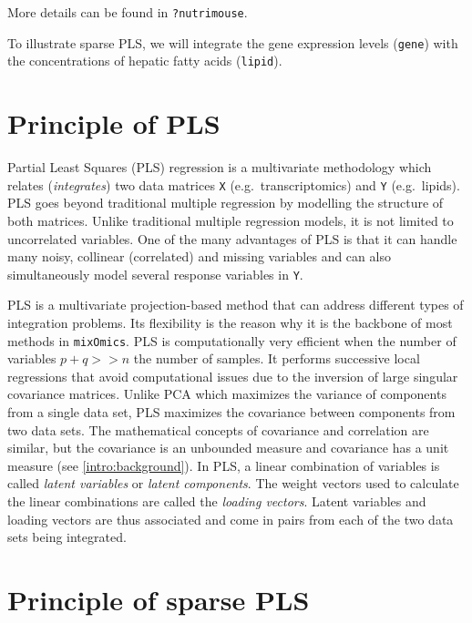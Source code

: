 \documentclass[]{book}
\begin{document}
More details can be found in \texttt{?nutrimouse}.

To illustrate sparse PLS, we will integrate the gene expression levels (\texttt{gene}) with the concentrations of hepatic fatty acids (\texttt{lipid}).

\hypertarget{principle-of-pls}{%
\section{Principle of PLS}\label{principle-of-pls}}

Partial Least Squares (PLS) regression \citep{Wol66, Wol01} is a multivariate methodology which relates (\textit{integrates}) two data matrices \texttt{X} (e.g.~transcriptomics) and \texttt{Y} (e.g.~lipids). PLS goes beyond traditional multiple regression by modelling the structure of both matrices. Unlike traditional multiple regression models, it is not limited to uncorrelated variables. One of the many advantages of PLS is that it can handle many noisy, collinear (correlated) and missing variables and can also simultaneously model several response variables in \texttt{Y}.

PLS is a multivariate projection-based method that can address different types of integration problems. Its flexibility is the reason why it is the backbone of most methods in \texttt{mixOmics}. PLS is computationally very efficient when the number of variables \(p + q >> n\) the number of samples. It performs successive local regressions that avoid computational issues due to the inversion of large singular covariance matrices. Unlike PCA which maximizes the variance of components from a single data set, PLS maximizes the covariance between components from two data sets. The mathematical concepts of covariance and correlation are similar, but the covariance is an unbounded measure and covariance has a unit measure (see \ref{intro:background}). In PLS, a linear combination of variables is called \emph{latent variables} or \emph{latent components}. The weight vectors used to calculate the linear combinations are called the \emph{loading vectors}. Latent variables and loading vectors are thus associated and come in pairs from each of the two data sets being integrated.

\hypertarget{principle-of-sparse-pls}{%
\section{Principle of sparse PLS}\label{principle-of-sparse-pls}}
\end{document}
